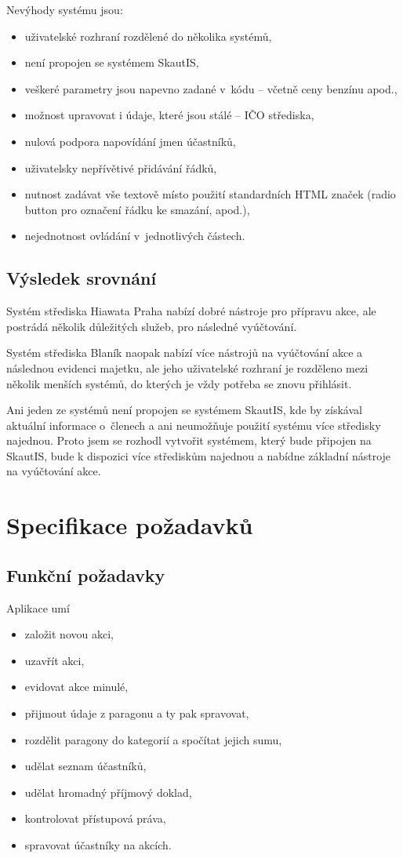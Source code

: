 \documentclass[thesis=B,czech]{FITthesis}[2012/04/27]
\begin{document}
Nevýhody systému jsou:
\begin{itemize}
	\item uživatelské rozhraní rozdělené do několika systémů,
	\item není propojen se systémem SkautIS,
	\item veškeré parametry jsou napevno zadané v~kódu -- včetně ceny benzínu apod.,
	\item možnost upravovat i údaje, které jsou stálé -- IČO střediska,
	\item nulová podpora napovídání jmen účastníků,
	\item uživatelsky nepřívětivé přidávání řádků,
	\item nutnost zadávat vše textově místo použití standardních HTML značek (radio button pro označení řádku ke smazání, apod.),
	\item nejednotnost ovládání v~jednotlivých částech.
\end{itemize}

\subsection{Výsledek srovnání}
Systém střediska Hiawata Praha nabízí dobré nástroje pro přípravu akce, ale postrádá několik důležitých služeb, pro následné vyúčtování.

Systém střediska Blaník naopak nabízí více nástrojů na vyúčtování akce a následnou evidenci majetku, ale jeho uživatelské rozhraní je rozděleno mezi několik menších systémů, do kterých je vždy potřeba se znovu přihlásit.

Ani jeden ze systémů není propojen se systémem SkautIS, kde by získával aktuální informace o~členech a ani neumožňuje použití systému více středisky najednou. Proto jsem se rozhodl vytvořit systémem, který bude připojen na SkautIS, bude k dispozici více střediskům najednou a nabídne základní nástroje na vyúčtování akce.

\section{Specifikace požadavků}
\subsection{Funkční požadavky}
Aplikace umí
\begin{itemize}
	\item založit novou akci,
	\item uzavřít akci,
	\item evidovat akce minulé,
	\item přijmout údaje z paragonu a ty pak spravovat,
	\item rozdělit paragony do kategorií a spočítat jejich sumu,
	\item udělat seznam účastníků,
	\item udělat hromadný příjmový doklad,
	\item kontrolovat přístupová práva,
	\item spravovat účastníky na akcích.
\end{itemize}
\end{document}
